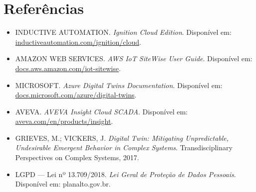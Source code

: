 \section{Referências}\label{referuxeancias}

\begin{itemize}
\tightlist
\item
  INDUCTIVE AUTOMATION. \emph{Ignition Cloud Edition}. Disponível em: \url{inductiveautomation.com/ignition/cloud}.
\item
  AMAZON WEB SERVICES. \emph{AWS IoT SiteWise User Guide}. Disponível em: \url{docs.aws.amazon.com/iot-sitewise}.
\item
  MICROSOFT. \emph{Azure Digital Twins Documentation}. Disponível em: \url{docs.microsoft.com/azure/digital-twins}.
\item
  AVEVA. \emph{AVEVA Insight Cloud SCADA}. Disponível em: \url{aveva.com/en/products/insight}.
\item
  GRIEVES, M.; VICKERS, J. \emph{Digital Twin: Mitigating Unpredictable, Undesirable Emergent Behavior in Complex Systems}. Transdisciplinary Perspectives on Complex Systems, 2017.
\item
  LGPD --- Lei nº 13.709/2018. \emph{Lei Geral de Proteção de Dados Pessoais}. Disponível em: planalto.gov.br.
\end{itemize}

